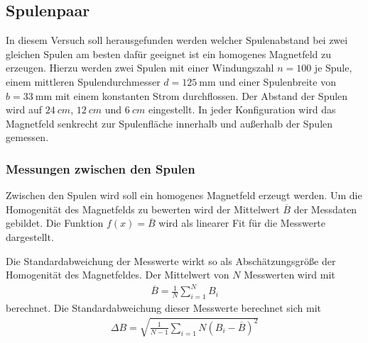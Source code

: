 \subsection{Spulenpaar}
\label{sec:spulenpaar}
In diesem Versuch soll herausgefunden werden welcher Spulenabstand bei zwei gleichen Spulen
am besten dafür geeignet ist ein homogenes Magnetfeld zu erzeugen.
Hierzu werden zwei Spulen mit einer Windungszahl $n= 100$ je Spule, einem mittleren Spulendurchmesser $d = \qty{125}{\mm}$
und einer Spulenbreite von $b = \qty[]{33}{\mm}$ mit einem konstanten Strom durchflossen.
Der Abstand der Spulen wird auf $\qty[]{24}{cm}$, $\qty[]{12}{cm}$ und $\qty[]{6}{cm}$ eingestellt.
In jeder Konfiguration wird das Magnetfeld senkrecht zur Spulenfläche innerhalb und außerhalb der Spulen gemessen.

\subsubsection{Messungen zwischen den Spulen}
Zwischen den Spulen wird soll ein homogenes Magnetfeld erzeugt werden.
Um die Homogenität des Magnetfelds zu bewerten wird der Mittelwert $\overline{B}$ der Messdaten gebildet.
Die Funktion $f(x) = \overline{B}$  wird als linearer Fit für die Messwerte dargestellt.





Die Standardabweichung der Messwerte wirkt so als Abschätzungsgröße der Homogenität des Magnetfeldes.
Der Mittelwert von $N$ Messwerten wird mit
\begin{align}
    \overline{B} = \frac{1}{N} \sum_{i=1}^{N} B_{i}
\end{align} 
berechnet.
Die Standardabweichung dieser Messwerte berechnet sich mit
\begin{align}
    \Delta B = \sqrt{\frac{1}{N-1} \sum_{i=1}{N}\left(B_{i}- \overline{B}\right)^2}
\end{align}

